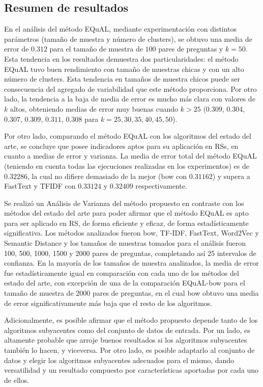 \subsection{Resumen de resultados}

En el análisis del método EQuAL, mediante experimentación con distintos parámetros (tamaño de muestra y número de clusters), se obtuvo una media de error de \(0.312\) para el tamaño de muestra de \(100\) pares de preguntas y \(k = 50\). Esta tendencia en los resultados demuestra dos particularidades: el método EQuAL tuvo buen rendimiento con tamaño de muestras chicas y con un alto número de clusters. Esta tendencia en tamaños de muestra chicos puede ser consecuencia del agregado de variabilidad que este método proporciona. Por otro lado, la tendencia a la baja de media de error es mucho más clara con valores de \(k\) altos, obteniendo medias de error muy buenas cuando \(k > 25\) (\(0.309\), \(0.304\), \(0.307\), \(0.309\), \(0.311\), \(0.308\) para  \(k = 25, 30, 35, 40, 45, 50\)).

\bigskip Por otro lado, comparando el método EQuAL con los algoritmos del estado del arte, se concluye que posee indicadores aptos para su aplicación en RSs, en cuanto a medias de error y varianza. La media de error total del método EQuAL (teniendo en cuenta todas las ejecuciones realizadas en los experimentos) es de \(0.32286\), la cual no difiere demasiado de la mejor (bow con \(0.31162\)) y supera a FastText y TFIDF con \(0.33124\) y \(0.32409\) respectivamente.

\bigskip Se realizó un Análisis de Varianza del método propuesto en contraste con los métodos del estado del arte para poder afirmar que el método EQuAL es apto para ser aplicado en RS, de forma eficiente y eficaz, de forma estadísticamente significativa. Los métodos analizados fueron bow, TF-IDF, FastText, Word2Vec y Semantic Distance y los tamaños de muestras tomados para el análisis fueron 100, 500, 1000, 1500 y 2000 pares de preguntas, completando así 25 intervalos de confianza. En la mayoría de los tamaños de muestra analizados, la media de error fue estadísticamente igual en comparación con cada uno de los métodos del estado del arte, con excepción de una de la comparación EQuAL-bow para el tamaño de muestra de 2000 pares de preguntas, en el cual bow obtuvo una media de error significativamente más baja que el resto de los algoritmos.

\bigskip Adicionalmente, es posible afirmar que el método propuesto depende tanto de los algoritmos subyacentes como del conjunto de datos de entrada. Por un lado, es altamente probable que arroje buenos resultados si los algoritmos subyacentes también lo hacen, y viceversa. Por otro lado, es posible adaptarlo al conjunto de datos y elegir los algoritmos subyacentes adecuados para el mismo, dando versatilidad y un resultado compuesto por características aportadas por cada uno de ellos.

